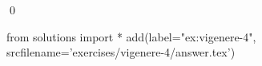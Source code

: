 
\begin{ex} 
  \label{ex:vigenere-4}
  
  \qed
\end{ex} 
\begin{python0}
from solutions import *
add(label="ex:vigenere-4",
    srcfilename='exercises/vigenere-4/answer.tex') 
\end{python0}

